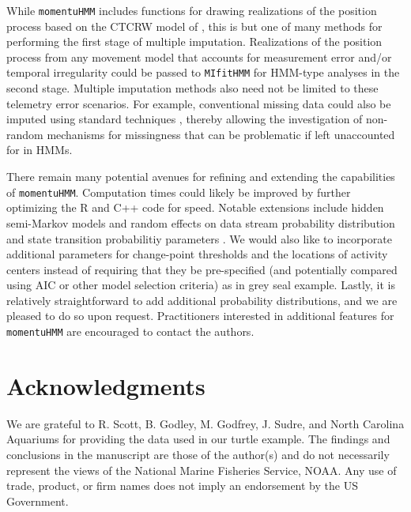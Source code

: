 \documentclass[12pt]{article}\usepackage[]{graphicx}\usepackage[]{color}
\begin{document}
While \verb|momentuHMM| includes functions for drawing realizations of the position process based on the CTCRW model of \cite{JohnsonEtAl2008}, this is but one of many methods for performing the first stage of multiple imputation. Realizations of the position process from any movement model that accounts for measurement error and/or temporal irregularity \citep[e.g.][]{CalabreseEtAl2016,GurarieEtAl2017} could be passed to \verb|MIfitHMM| for HMM-type analyses in the second stage. Multiple imputation methods also need not be limited to these telemetry error scenarios. For example, conventional missing data could also be imputed using standard techniques \citep{RubinSchenker1986}, thereby allowing the investigation of non-random mechanisms for missingness that can be problematic if left unaccounted for in HMMs.

There remain many potential avenues for refining and extending the capabilities of \verb|momentuHMM|. Computation times could likely be improved by further optimizing the R and C++ code for speed. Notable extensions include hidden semi-Markov models and random effects on data stream probability distribution and state transition probabilitiy parameters \citep{ZucchiniEtAl2016}. We would also like to incorporate additional parameters for change-point thresholds and the locations of activity centers instead of requiring that they be pre-specified (and potentially compared using AIC or other model selection criteria) as in grey seal example. Lastly, it is relatively straightforward to add additional probability distributions, and we are pleased to do so upon request. Practitioners interested in additional features for \verb|momentuHMM| are encouraged to contact the authors.

\section*{Acknowledgments} 
We are grateful to R. Scott, B. Godley, M. Godfrey, J. Sudre, and North Carolina Aquariums for providing the data used in our turtle example. The findings and conclusions in the manuscript are those of the author(s) and do not necessarily represent the views of the National Marine Fisheries Service, NOAA. Any use of trade, product, or firm names does not imply an endorsement by the US Government.




\clearpage
\end{document}
